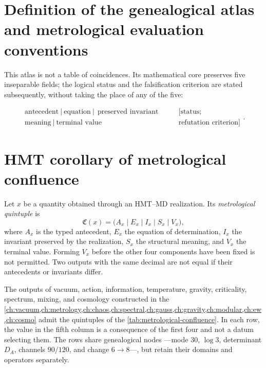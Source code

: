 \section{Definition of the genealogical atlas and metrological evaluation conventions}

This atlas is not a table of coincidences. Its mathematical core preserves
five inseparable fields; the logical status and the falsification criterion are stated subsequently, without taking the place of any of the five:

\begin{equation}
\boxed{
\begin{gathered}
\text{antecedent}\ \big|\ \text{equation}\ \big|\
\ \text{preserved invariant}\\
\text{meaning}\ \big|\ \text{terminal value}
\end{gathered}}
\qquad
\begin{gathered}
[\text{status};\\ \text{refutation criterion}]
\end{gathered}.
\label{eq:atlas-six-fields}
\end{equation}


\section{HMT corollary of metrological confluence}
\label{sec:metrological-confluence}

\begin{definition}
Let \(x\) be a quantity obtained through an HMT--MD realization. Its
\emph{metrological
quintuple} is
\[
 \mathfrak C(x)=
 \bigl(A_x\mid E_x\mid I_x\mid S_x\mid V_x\bigr),
\]
where \(A_x\) is the typed antecedent, \(E_x\) the equation of
determination, \(I_x\) the invariant preserved by the realization,
\(S_x\) the structural
meaning, and \(V_x\) the terminal value. Forming \(V_x\) before
the other four components have been fixed is not permitted. Two outputs with the same decimal
are not equal if their antecedents or invariants differ.
\end{definition}

\begin{corollary}
\label{cor:metrological-confluence}
The outputs of vacuum, action, information, temperature, gravity,
criticality, spectrum, mixing, and cosmology constructed in the
\cref{ch:vacuum,ch:metrology,ch:chaos,ch:spectral,ch:gauss,ch:gravity,ch:modular,ch:ew,ch:cosmo}
admit the quintuples of the \cref{tab:metrological-confluence}. In each
row, the value in the fifth column is a consequence of the first four and
not a datum selecting them. The rows share genealogical nodes
---mode \(30\), \(\log3\), determinant \(D_A\), channels \(90/120\), and change
\(6\to8\)---, but retain their domains and operators separately.
\end{corollary}

